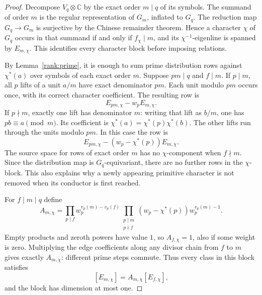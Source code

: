 \begin{proof}
Decompose $V_q\otimes\mathbb C$ by the exact order $m\mid q$ of its
symbols.  The summand of order $m$ is the regular representation of
$G_m$, inflated to $G_q$.  The reduction map $G_q\to G_m$ is surjective
by the Chinese remainder theorem.  Hence a character $\chi$ of $G_q$
occurs in that summand if and only if $f_\chi\mid m$, and its
$\chi^{-1}$-eigenline is spanned by $E_{m,\chi}$.  This identifies every
character block before imposing relations.

By Lemma~\ref{rank:prime}, it is enough to sum prime distribution rows
against $\chi^*(a)$ over symbols of each exact order $m$.  Suppose
$pm\mid q$ and $f\mid m$.  If $p\mid m$, all $p$ lifts of a unit
$a/m$ have exact denominator $pm$.  Each unit modulo $pm$ occurs once,
with its correct character coefficient.  The resulting row is
\begin{equation}\label{rank:edge-ramified}
 E_{pm,\chi}-w_p E_{m,\chi}.
\end{equation}
If $p\nmid m$, exactly one lift has denominator $m$: writing that lift
as $b/m$, one has $pb\equiv a\pmod m$.  Its coefficient is
$\chi^*(a)=\chi^*(p)\chi^*(b)$.  The other lifts run through the units
modulo $pm$.  In this case the row is
\begin{equation}\label{rank:edge-unramified}
 E_{pm,\chi}-(w_p-\chi^*(p))E_{m,\chi}.
\end{equation}
The source space for rows of exact order $m$ has no $\chi$-component
when $f\nmid m$.  Since the distribution map is $G_q$-equivariant,
there are no further rows in the $\chi$-block.  This also explains why
a newly appearing primitive character is not removed when its conductor
is first reached.

For $f\mid m\mid q$ define
\begin{equation}\label{rank:A}
 A_{m,\chi}=
 \prod_{p\mid f}w_p^{v_p(m)-v_p(f)}
 \prod_{\substack{p\mid m\\p\nmid f}}
       (w_p-\chi^*(p))w_p^{v_p(m)-1}.
\end{equation}
Empty products and zeroth powers have value $1$, so $A_{f,\chi}=1$,
also if some weight is zero.  Multiplying the edge coefficients along
any divisor chain from $f$ to $m$ gives exactly $A_{m,\chi}$:
different prime steps commute.  Thus every class in this block satisfies
\begin{equation}\label{rank:transport}
 [E_{m,\chi}]=A_{m,\chi}[E_{f,\chi}],
\end{equation}
and the block has dimension at most one.


\end{proof}
